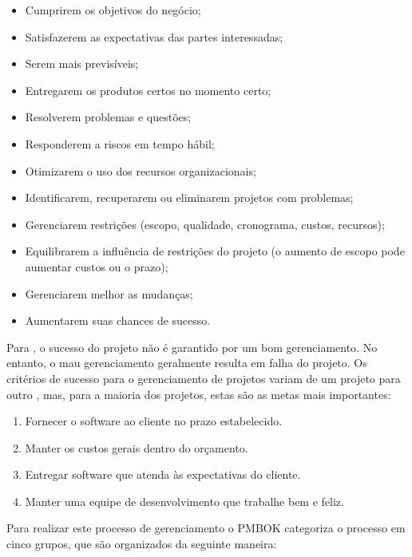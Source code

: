 \documentclass[
	12pt,
	openright,
	twoside,
	a4paper,
	english,
	brazil
	]{abntex2}
\begin{document}
\begin{itemize}
  \item Cumprirem os objetivos do negócio;
  \item Satisfazerem as expectativas das partes interessadas;
  \item Serem mais previsíveis;
  \item Entregarem os produtos certos no momento certo;
  \item Resolverem problemas e questões;
  \item Responderem a riscos em tempo hábil;
  \item Otimizarem o uso dos recursos organizacionais;
  \item Identificarem, recuperarem ou eliminarem projetos com problemas;
  \item Gerenciarem restrições (escopo, qualidade, cronograma, custos, recursos);
  \item Equilibrarem a influência de restrições do projeto (o aumento de escopo pode aumentar custos ou o prazo);
  \item Gerenciarem melhor as mudanças;
  \item Aumentarem suas chances de sucesso.
\end{itemize}

Para , o sucesso do projeto não é garantido por um bom gerenciamento. No entanto, o mau gerenciamento geralmente resulta em falha do projeto. Os critérios de sucesso para o gerenciamento de projetos variam de um projeto para outro \cite{Pressman_2014}, mas, para a maioria dos projetos, estas são as metas mais importantes:

\begin{enumerate}
  \item Fornecer o software ao cliente no prazo estabelecido.
  \item Manter os custos gerais dentro do orçamento.
  \item Entregar software que atenda às expectativas do cliente.
  \item Manter uma equipe de desenvolvimento que trabalhe bem e feliz.
\end{enumerate}

Para realizar este processo de gerenciamento o PMBOK \cite{PMBOK} categoriza o processo em cinco grupos, que são organizados da seguinte maneira:
\end{document}
